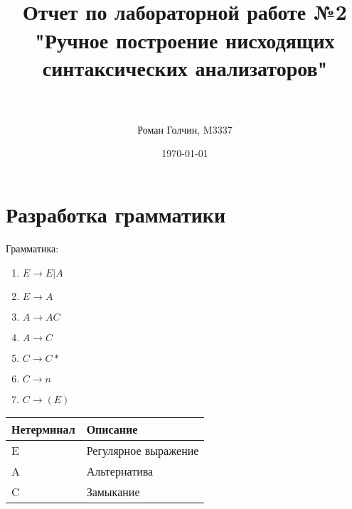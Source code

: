 \documentclass[paper=a4, fontsize=11pt]{scrartcl} %
\title{	
\normalfont \normalsize 
\horrule{0.5pt} \\[0.4cm] %
\huge Отчет по лабораторной работе №2 "Ручное построение
нисходящих синтаксических анализаторов" \\ %
\horrule{2pt} \\[0.5cm] %
}
\author{Роман Голчин, M3337} %
\date{\normalsize\today} %
\numberwithin{equation}{section} %
\numberwithin{figure}{section} %
\numberwithin{table}{section} %
\begin{document}
\maketitle %



\section{Разработка грамматики}

\begin{flushleft}
Грамматика:
\begin{enumerate}
    \item$E\rightarrow E|A$
    \item$E\rightarrow A$
    \item$A\rightarrow AC$
    \item$A\rightarrow C$
    \item$C\rightarrow C*$
    \item$C\rightarrow n$
    \item$C\rightarrow (E)$
\end{enumerate}

\begin{tabular}{|l|l|}
\hline
Нетерминал & Описание \\ \hline
E & Регулярное выражение\\ \hline
A& Альтернатива\\  \hline
C& Замыкание\\ \hline
\end{tabular}

\end{flushleft}
\end{document}
